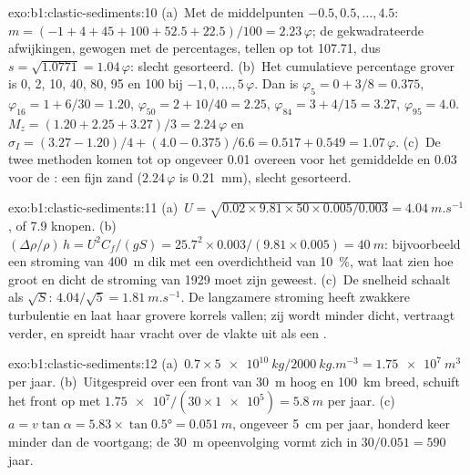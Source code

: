 \begin{solution}{exo:b1:clastic-sediments:10}
(a)~Met de middelpunten $-0.5, 0.5, \ldots, 4.5$: $m = (-1 + 4 + 45 + 100 + 52.5
+ 22.5)/100 = 2.23\,\varphi$; de gekwadrateerde afwijkingen, gewogen met de
percentages, tellen op tot \num{107.71}, dus $s = \sqrt{1.0771} = 1.04\,\varphi$:
slecht gesorteerd. (b)~Het cumulatieve percentage grover is 0, 2, 10, 40, 80, 95 en
100 bij $-1, 0, \ldots, 5\,\varphi$. Dan is $\varphi_5 = 0 + 3/8 = 0.375$,
$\varphi_{16} = 1 + 6/30 = 1.20$, $\varphi_{50} = 2 + 10/40 = 2.25$,
$\varphi_{84} = 3 + 4/15 = 3.27$, $\varphi_{95} = 4.0$. $M_z = (1.20 + 2.25 +
3.27)/3 = 2.24\,\varphi$ en $\sigma_I = (3.27 - 1.20)/4 + (4.0 - 0.375)/6.6 =
0.517 + 0.549 = 1.07\,\varphi$. (c)~De twee methoden komen tot op ongeveer
\num{0.01} overeen voor het gemiddelde en \num{0.03} voor de : een fijn zand
($2.24\,\varphi$ is \qty{0.21}{mm}), slecht gesorteerd.
\end{solution}

\begin{solution}{exo:b1:clastic-sediments:11}
(a)~$U = \sqrt{0.02 \times 9.81 \times 50 \times 0.005/0.003} =
\qty{4.04}{m.s^{-1}}$, of 7.9 knopen. (b)~$(\Delta\rho/\rho)\,h = U^2
C_f/(gS) = 25.7^2 \times 0.003/(9.81 \times 0.005) = \qty{40}{m}$: bijvoorbeeld
een stroming van \qty{400}{m} dik met een overdichtheid van \qty{10}{\percent}, wat laat zien
hoe groot en dicht de stroming van 1929 moet zijn geweest. (c)~De snelheid schaalt als
$\sqrt S$: $4.04/\sqrt 5 = \qty{1.81}{m.s^{-1}}$. De langzamere stroming heeft
zwakkere turbulentie en laat haar grovere korrels vallen; zij wordt minder dicht, vertraagt
verder, en spreidt haar vracht over de vlakte uit als een .
\end{solution}

\begin{solution}{exo:b1:clastic-sediments:12}
(a)~$0.7 \times \qty{5e10}{kg}/\qty{2000}{kg.m^{-3}} = \qty{1.75e7}{m^3}$ per
jaar. (b)~Uitgespreid over een front van \qty{30}{m} hoog en \qty{100}{km} breed, schuift
het front op met $\num{1.75e7}/(30 \times \num{1e5}) = \qty{5.8}{m}$ per jaar. (c)~$a = v\tan\alpha = 5.83 \times \tan\ang{0.5} = \qty{0.051}{m}$, ongeveer
\qty{5}{cm} per jaar, honderd keer minder dan de voortgang; de \qty{30}{m} opeenvolging
vormt zich in $30/0.051 = 590$ jaar.
\end{solution}

